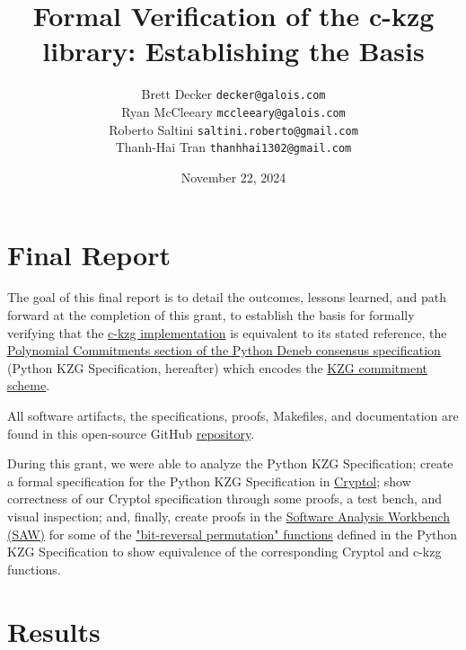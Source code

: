 \documentclass[12pt]{galois-whitepaper}
\author{Brett Decker \texttt{decker@galois.com}\\
Ryan McCleeary \texttt{mccleeary@galois.com}\\
Roberto Saltini \texttt{saltini.roberto@gmail.com}\\
Thanh-Hai Tran \texttt{thanhhai1302@gmail.com}
}
\title{Formal Verification of the c-kzg library: Establishing the Basis}
\date{November 22, 2024}
\begin{document}
\maketitle

\vspace*{2cm}

\newpage
\tableofcontents
\newpage

\section{Final Report}
The goal of this final report is to detail the outcomes, lessons learned, and path forward at the completion of this grant, to establish the basis for formally verifying that
the \href{https://github.com/ethereum/c-kzg-4844}{c-kzg implementation} is equivalent to its stated reference,
the \href{https://github.com/ethereum/consensus-specs/blob/dev/specs/deneb/polynomial-commitments.md}{Polynomial Commitments section of the Python Deneb consensus specification} (Python KZG Specification, hereafter) which encodes the \href{https://www.iacr.org/archive/asiacrypt2010/6477178/6477178.pdf}{KZG commitment scheme}.

All software artifacts, the specifications, proofs, Makefiles, and documentation are found in this open-source GitHub \href{https://github.com/GaloisInc/ckzg-eip-4844-verification}{repository}.

During this grant, we were able to analyze the Python KZG Specification; create a formal specification
for the Python KZG Specification in \href{https://cryptol.net}{Cryptol}; show correctness of our Cryptol
specification through some proofs, a test bench, and visual inspection; and, finally, create proofs in
the \href{https://saw.galois.com}{Software Analysis Workbench (SAW)} for some of the
\href{https://github.com/ethereum/consensus-specs/blob/dev/specs/deneb/polynomial-commitments.md\#bit-reversal-permutation}
{"bit-reversal permutation" functions} defined in the Python KZG Specification to show equivalence of
the corresponding Cryptol and c-kzg functions.

\section{Results}
\end{document}
